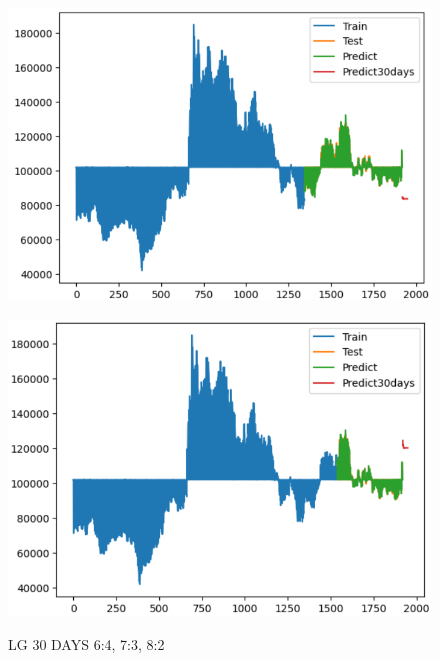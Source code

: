 \documentclass{article}
\begin{document}
\begin{multicols}{2}
\begin{figure}[H]
\begin{minipage}{0.15\textwidth}
    \label{fig:1}
    \end{minipage}%
    \begin{minipage}{0.15\textwidth}
    \centering
    \includegraphics[width=1\textwidth]{Image/XGBoost/LG_7_3_30.png}
  
    \label{fig:2}
    \end{minipage}%
    \begin{minipage}{0.15\textwidth}
    \centering
    \includegraphics[width=1\textwidth]{Image/XGBoost/LG_8_2_30.png}

    \label{fig:3}
    \end{minipage}
    \caption{LG 30 DAYS  6:4, 7:3, 8:2 }
\end{figure}




\end{multicols}
\end{document}
